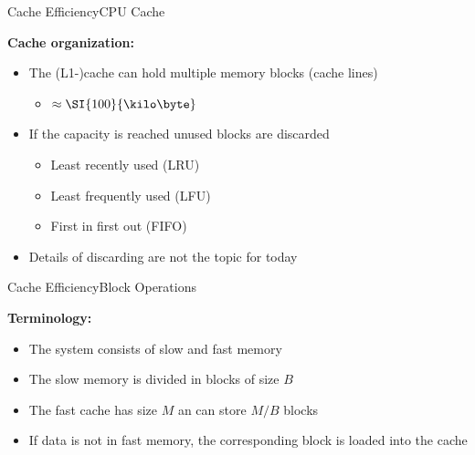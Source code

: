 \begin{frame}{Cache Efficiency}{CPU Cache}
  \vspace{-1.5em}
  \begin{figure}
    \begin{adjustbox}{width=\linewidth}
      
    \end{adjustbox}
    \label{fig:caching:cache_hirarchy2}
  \end{figure}
  \vspace{-0.3cm}
  \textbf{Cache organization:}
  \begin{itemize}
    \item<3->
      The (L1-)cache can hold multiple memory blocks (cache lines)
      \begin{itemize}
        \item<4->
          $\approx\SI{100}{\kilo\byte}$
        \end{itemize}  
    \item<5->
      If the capacity is reached unused blocks are discarded
      \begin{itemize}
        \item<6->
          {\color{Mittel-Blau}Least recently used (LRU)}
        \item<7->
          {\color{Mittel-Blau}Least frequently used (LFU)}
        \item<8->
          {\color{Mittel-Blau}First in first out (FIFO)}
      \end{itemize}
      \item<9-> Details of discarding are not the topic for today
  \end{itemize}
\end{frame}


\begin{frame}{Cache Efficiency}{Block Operations}
  \vspace{-2.0em}
  \begin{figure}%
    \begin{adjustbox}{width=\linewidth}%
    \end{adjustbox}%
    \label{fig:caching:cache_quanting}
  \end{figure}%
  \textbf{Terminology:}
  \begin{itemize}
    \item<2->
      The system consists of slow and fast memory 
    \item<3->
      The {\color{Mittel-Blau}slow memory} is divided in
      {\color{Mittel-Blau}blocks of size $B$}
    \item<4->
      The {\color{Mittel-Blau}fast cache} has size $M$ an can store $M/B$
      blocks
    \item<5->
      If data is not in fast memory, the corresponding block is loaded into the {\color{Mittel-Blau}cache}
  \end{itemize}
\end{frame}

